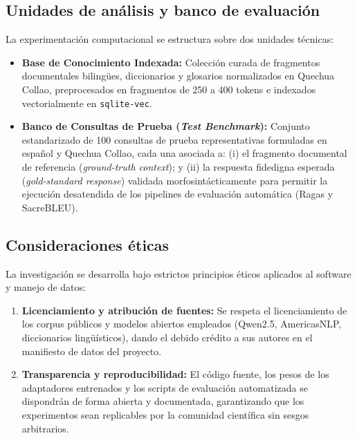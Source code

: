 \subsection{Unidades de análisis y banco de evaluación}
La experimentación computacional se estructura sobre dos unidades técnicas:
\begin{itemize}
    \item \textbf{Base de Conocimiento Indexada:} Colección curada de fragmentos documentales bilingües, diccionarios y glosarios normalizados en Quechua Collao, preprocesados en fragmentos de 250 a 400 tokens e indexados vectorialmente en \texttt{sqlite-vec}.
    \item \textbf{Banco de Consultas de Prueba (\textit{Test Benchmark}):} Conjunto estandarizado de 100 consultas de prueba representativas formuladas en español y Quechua Collao, cada una asociada a: (i) el fragmento documental de referencia (\textit{ground-truth context}); y (ii) la respuesta fidedigna esperada (\textit{gold-standard response}) validada morfosintácticamente para permitir la ejecución desatendida de los pipelines de evaluación automática (Ragas y SacreBLEU).
\end{itemize}

\subsection{Consideraciones éticas}
La investigación se desarrolla bajo estrictos principios éticos aplicados al software y manejo de datos:
\begin{enumerate}
    \item \textbf{Licenciamiento y atribución de fuentes:} Se respeta el licenciamiento de los corpus públicos y modelos abiertos empleados (Qwen2.5, AmericasNLP, diccionarios lingüísticos), dando el debido crédito a sus autores en el manifiesto de datos del proyecto.
    \item \textbf{Transparencia y reproducibilidad:} El código fuente, los pesos de los adaptadores entrenados y los scripts de evaluación automatizada se dispondrán de forma abierta y documentada, garantizando que los experimentos sean replicables por la comunidad científica sin sesgos arbitrarios.
\end{enumerate}
